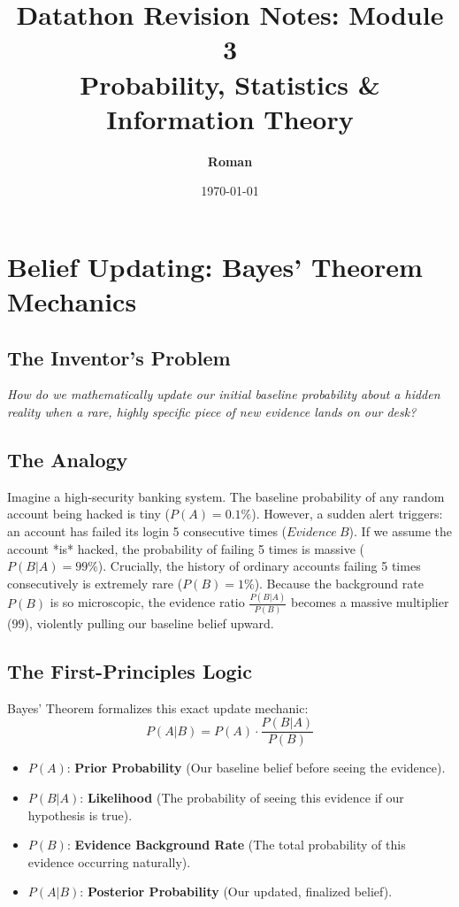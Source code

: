 \documentclass[12pt,a4paper]{article}
\title{\textbf{\color{primary}Datathon Revision Notes: Module 3 \\ Probability, Statistics \& Information Theory}}
\author{\textbf{Roman}}
\date{\today}
\begin{document}
\color{darktext}
\maketitle

\section{Belief Updating: Bayes' Theorem Mechanics}
\subsection*{The Inventor's Problem}
\textit{How do we mathematically update our initial baseline probability about a hidden reality when a rare, highly specific piece of new evidence lands on our desk?}

\subsection*{The Analogy}
Imagine a high-security banking system. The baseline probability of any random account being hacked is tiny ($P(A) = 0.1\%$). However, a sudden alert triggers: an account has failed its login 5 consecutive times ($Evidence\ B$). If we assume the account *is* hacked, the probability of failing 5 times is massive ($P(B|A) = 99\%$). Crucially, the history of ordinary accounts failing 5 times consecutively is extremely rare ($P(B) = 1\%$). Because the background rate $P(B)$ is so microscopic, the evidence ratio $\frac{P(B|A)}{P(B)}$ becomes a massive multiplier ($99$), violently pulling our baseline belief upward.

\subsection*{The First-Principles Logic}
Bayes' Theorem formalizes this exact update mechanic:
$$P(A|B) = P(A) \cdot \frac{P(B|A)}{P(B)}$$
\begin{itemize}
    \item $P(A)$: \textbf{Prior Probability} (Our baseline belief before seeing the evidence).
    \item $P(B|A)$: \textbf{Likelihood} (The probability of seeing this evidence if our hypothesis is true).
    \item $P(B)$: \textbf{Evidence Background Rate} (The total probability of this evidence occurring naturally).
    \item $P(A|B)$: \textbf{Posterior Probability} (Our updated, finalized belief).
\end{itemize}
\end{document}
